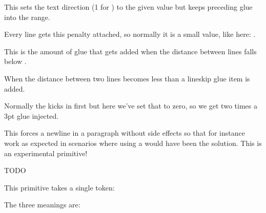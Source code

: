This sets the text direction (1 for ) to the given value but keeps
preceding glue into the range.

\stopnewprimitive

\startoldprimitive[title={\prm {linepenalty}}]

Every line gets this penalty attached, so normally it is a small value, like
here: \the \linepenalty.

\stopoldprimitive

\startoldprimitive[title={\prm {lineskip}}]

This is the amount of glue that gets added when the distance between lines falls
below .

\stopoldprimitive

\startoldprimitive[title={\prm {lineskiplimit}}]

When the distance between two lines becomes less than  a \prm
{lineskip} glue item is added.

\startbuffer
{}
\stopbuffer

\typebuffer

Normally the  kicks in first but here we've set that to zero,
so we get two times a 3pt glue injected.

\startlocallinecorrection
\getbuffer
\stoplocallinecorrection

\stopoldprimitive

\startnewprimitive[title={\prm {localbreakpar}}]

This forces a newline in a paragraph without side effects so that for instance
 work as expected in scenarios where using a 
would have been the solution. This is an experimental primitive!

\stopnewprimitive

\startnewprimitive[title={\prm {localbrokenpenalty}}]
    TODO
\stopnewprimitive

\startnewprimitive[title={\prm {localcontrol}}]

This primitive takes a single token:

\startbuffer
\edef\testa{\scratchcounter123 \the\scratchcounter}
\edef\testc{\testa \the\scratchcounter}
\edef\testd{\localcontrol\testa \the\scratchcounter}
\stopbuffer

\typebuffer

The three meanings are:


